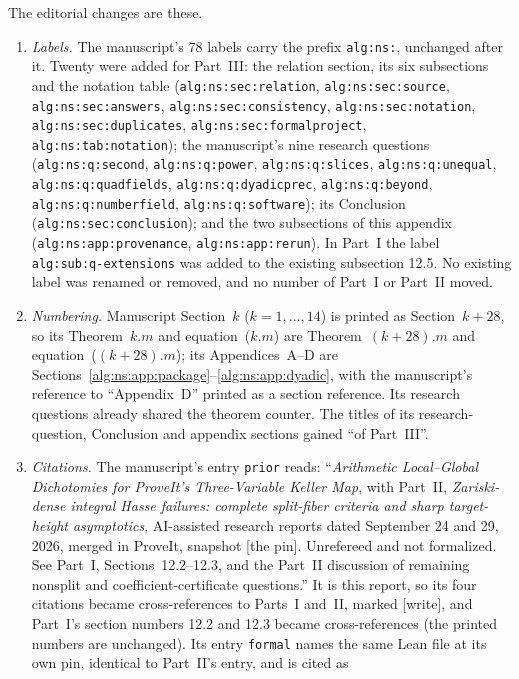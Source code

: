 \documentclass[11pt]{article}
\numberwithin{equation}{section}
\theoremstyle{plain}
\theoremstyle{plain}
\theoremstyle{plain}
\theoremstyle{definition}
\theoremstyle{definition}
\theoremstyle{definition}
\theoremstyle{remark}
\newcommand{\wtag}{\textup{[write]}}%
\newcommand{\rpath}[1]{\nolinkurl{#1}}
\begin{document}
The editorial changes are these.
\begin{enumerate}[label=(\arabic*)]
\item \emph{Labels.} The manuscript's 78 labels carry the prefix
\texttt{alg:ns:}, unchanged after it. Twenty were added for Part~III: the
relation section, its six subsections and the notation table
(\rpath{alg:ns:sec:relation}, \rpath{alg:ns:sec:source},
\rpath{alg:ns:sec:answers}, \rpath{alg:ns:sec:consistency},
\rpath{alg:ns:sec:notation}, \rpath{alg:ns:sec:duplicates},
\rpath{alg:ns:sec:formalproject}, \rpath{alg:ns:tab:notation}); the
manuscript's nine research questions (\rpath{alg:ns:q:second},
\rpath{alg:ns:q:power}, \rpath{alg:ns:q:slices}, \rpath{alg:ns:q:unequal},
\rpath{alg:ns:q:quadfields}, \rpath{alg:ns:q:dyadicprec},
\rpath{alg:ns:q:beyond}, \rpath{alg:ns:q:numberfield},
\rpath{alg:ns:q:software}); its Conclusion
(\rpath{alg:ns:sec:conclusion}); and the two subsections of this
appendix (\rpath{alg:ns:app:provenance}, \rpath{alg:ns:app:rerun}). In
Part~I the label \rpath{alg:sub:q-extensions} was added to the existing
subsection 12.5. No existing label was renamed or removed, and no number
of Part~I or Part~II moved.
\item \emph{Numbering.} Manuscript Section~$k$ ($k=1,\ldots,14$) is
printed as Section~$k+28$, so its Theorem~$k.m$ and equation~($k.m$) are
Theorem~$(k+28).m$ and equation~($(k+28).m$); its Appendices~A--D are
Sections~\ref{alg:ns:app:package}--\ref{alg:ns:app:dyadic}, with the
manuscript's reference to ``Appendix~D'' printed as a section reference.
Its research questions already shared the theorem counter. The titles of
its research-question, Conclusion and appendix sections gained ``of
Part~III''.
\item \emph{Citations.} The manuscript's entry \texttt{prior} reads:
``\emph{Arithmetic Local--Global Dichotomies for ProveIt's Three-Variable
Keller Map}, with Part~II, \emph{Zariski-dense integral Hasse failures:
complete split-fiber criteria and sharp target-height asymptotics},
AI-assisted research reports dated September 24 and 29, 2026, merged in
ProveIt, snapshot [the pin]. Unrefereed and not formalized. See Part~I,
Sections~12.2--12.3, and the Part~II discussion of remaining nonsplit and
coefficient-certificate questions.'' It is this report, so its four
citations became cross-references to Parts~I and~II, marked \wtag, and
Part~I's section numbers 12.2 and 12.3 became cross-references (the
printed numbers are unchanged). Its entry \texttt{formal} names the same
Lean file at its own pin, identical to Part~II's entry, and is cited as

\end{enumerate}
\end{document}
